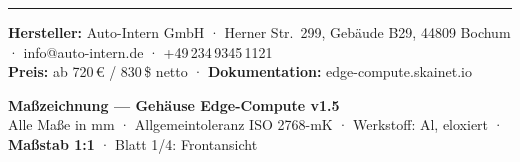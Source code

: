 \documentclass[10pt,a4paper]{article}
\begin{document}
\vspace{2mm}\hrule\vspace{1.5mm}
{\small
\textbf{Hersteller:} Auto-Intern GmbH · Herner Str.\ 299, Gebäude B29, 44809 Bochum · info@auto-intern.de · +49\,234\,9345\,1121\\
\textbf{Preis:} ab 720\,€ / 830\,\$ netto · \textbf{Dokumentation:} edge-compute.skainet.io}

\newpage
\thispagestyle{fancy}
\begin{center}
{\large\textbf{Maßzeichnung — Gehäuse Edge-Compute v1.5}}\\[1mm]
{\small Alle Maße in mm · Allgemeintoleranz ISO 2768-mK · Werkstoff: Al, eloxiert · \textbf{Maßstab 1:1} · Blatt 1/4: Frontansicht}
\end{center}
\vfill
\end{document}
